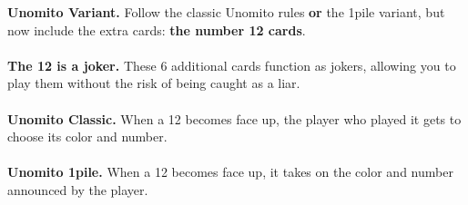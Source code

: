\documentclass[a4paper]{memoir}
\begin{document}
{\footnotesize

\noindent
\textbf{ Unomito Variant.} Follow the classic Unomito rules \textbf{or} the 1pile variant, but now include the extra cards: \textbf{the number 12 cards}.
\\
\\
\noindent
\textbf{ The 12 is a joker.} These 6 additional cards function as jokers, allowing you to play them without the risk of being caught as a liar.
\\
\\
\noindent
\textbf{ Unomito Classic.} When a 12 becomes face up, the player who played it gets to choose its color and number.
\\
\\
\noindent
\textbf{ Unomito 1pile.} When a 12 becomes face up, it takes on the color and number announced by the player.
}
\end{document}
